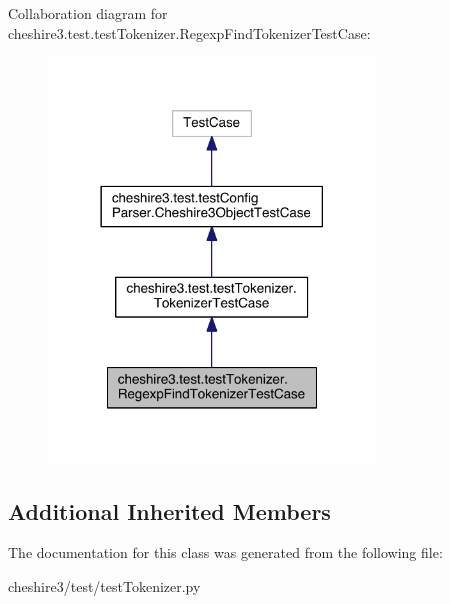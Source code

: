 Collaboration diagram for cheshire3.\-test.\-test\-Tokenizer.\-Regexp\-Find\-Tokenizer\-Test\-Case\-:
\nopagebreak
\begin{figure}[H]
\begin{center}
\leavevmode
\includegraphics[width=246pt]{classcheshire3_1_1test_1_1test_tokenizer_1_1_regexp_find_tokenizer_test_case__coll__graph}
\end{center}
\end{figure}
\subsection*{Additional Inherited Members}


The documentation for this class was generated from the following file\-:\begin{DoxyCompactItemize}
\item 
cheshire3/test/test\-Tokenizer.\-py\end{DoxyCompactItemize}
